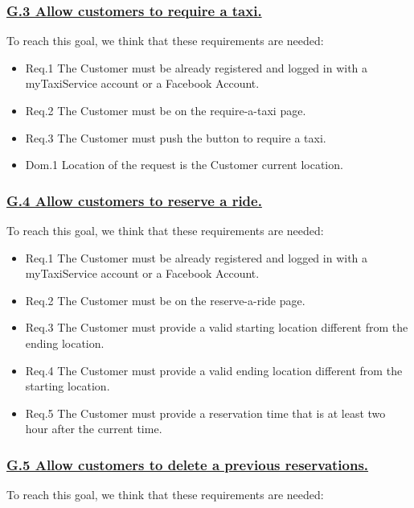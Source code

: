 \documentclass{report}
\begin{document}
			\subsubsection{\lbrack \hyperref[sec:g3]{G.3 Allow customers to require a taxi.}\rbrack}
			To reach this goal, we think that these requirements are needed:

				\begin{itemize}
					\item \lbrack Req.1\rbrack \label{sec:fr1_g3} The Customer must be already registered and logged in with a myTaxiService account or a Facebook Account.
					\item \lbrack Req.2\rbrack \label{sec:fr2_g3} The Customer must be on the require-a-taxi page.
					\item \lbrack Req.3\rbrack \label{sec:fr3_g3} The Customer must push the button to require a taxi.
					\item \lbrack Dom.1\rbrack \label{sec:da1_g3} Location of the request is the Customer current location.
				\end{itemize}

			\subsubsection{\lbrack \hyperref[sec:g4]{G.4 Allow customers to reserve a ride.}\rbrack}
			To reach this goal, we think that these requirements are needed:

				\begin{itemize}
					\item \lbrack Req.1\rbrack \label{sec:fr1_g4} The Customer must be already registered and logged in with a myTaxiService account or a Facebook Account.
					\item \lbrack Req.2\rbrack \label{sec:fr2_g4} The Customer must be on the reserve-a-ride page.
					\item \lbrack Req.3\rbrack \label{sec:fr3_g4} The Customer must provide a valid starting location different from the ending location.
					\item \lbrack Req.4\rbrack \label{sec:fr4_g4} The Customer must provide a valid ending location different from the starting location.
					\item \lbrack Req.5\rbrack \label{sec:fr5_g4} The Customer must provide a reservation time that is at least two hour after the current time.
				\end{itemize}

			\subsubsection{\lbrack \hyperref[sec:g5]{G.5 Allow customers to delete a previous reservations.}\rbrack}
			To reach this goal, we think that these requirements are needed:
\end{document}
